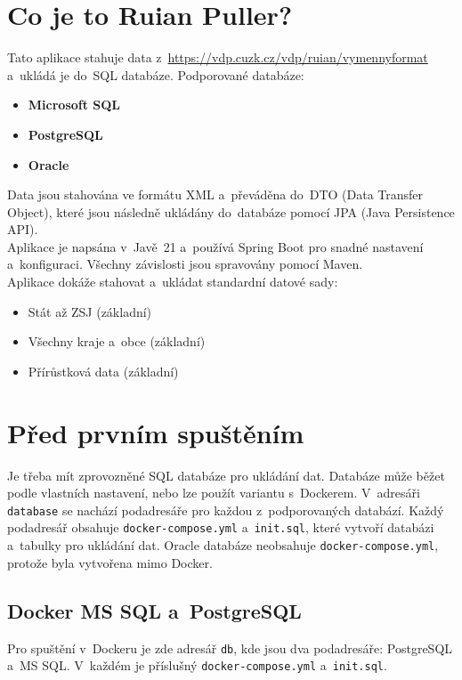 \section*{Co je to Ruian Puller?}
Tato aplikace stahuje data z~\url{https://vdp.cuzk.cz/vdp/ruian/vymennyformat} \\ a~ukládá je do~SQL databáze.
Podporované databáze:
\begin{itemize}
  \item \textbf{Microsoft SQL}
  \item \textbf{PostgreSQL}
  \item \textbf{Oracle}
\end{itemize}

Data jsou stahována ve formátu XML a~převáděna do~DTO (Data Transfer Object), které jsou následně ukládány do~databáze pomocí JPA (Java Persistence API).\\
Aplikace je napsána v~Javě~21 a~používá Spring Boot pro snadné nastavení a~konfiguraci. Všechny závislosti jsou spravovány pomocí Maven.\\
Aplikace dokáže stahovat a~ukládat standardní datové sady:
\begin{itemize}
  \item Stát až ZSJ (základní)
  \item Všechny kraje a~obce (základní)
  \item Přírůstková data (základní)
\end{itemize}

\section*{Před prvním spuštěním}
Je třeba mít zprovozněné SQL databáze pro ukládání dat. Databáze může běžet podle vlastních nastavení, nebo lze použít variantu s~Dockerem.
V~adresáři \texttt{database} se nachází podadresáře pro každou z~podporovaných databází. Každý podadresář obsahuje \texttt{docker-compose.yml} a~\texttt{init.sql},
které vytvoří databázi a~tabulky pro ukládání dat.
Oracle databáze neobsahuje \texttt{docker-compose.yml}, protože byla vytvořena mimo Docker.

\subsection*{Docker MS SQL a~PostgreSQL}
Pro spuštění v~Dockeru je zde adresář \texttt{db}, kde jsou dva podadresáře: PostgreSQL a~MS SQL. V~každém je příslušný \texttt{docker-compose.yml} a~\texttt{init.sql}.

